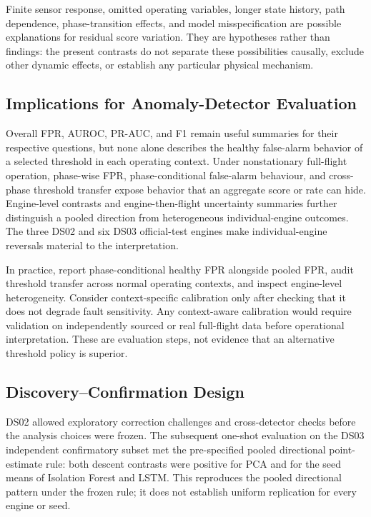 \documentclass[preprint,12pt]{elsarticle}
\begin{document}
Finite sensor response, omitted operating variables, longer state history, path dependence, phase-transition effects, and model misspecification are possible explanations for residual score variation. They are hypotheses rather than findings: the present contrasts do not separate these possibilities causally, exclude other dynamic effects, or establish any particular physical mechanism.

\subsection{Implications for Anomaly-Detector Evaluation}\label{implications-for-anomaly-detector-evaluation}

Overall FPR, AUROC, PR-AUC, and F1 remain useful summaries for their respective questions, but none alone describes the healthy false-alarm behavior of a selected threshold in each operating context. Under nonstationary full-flight operation, phase-wise FPR, phase-conditional false-alarm behaviour, and cross-phase threshold transfer expose behavior that an aggregate score or rate can hide. Engine-level contrasts and engine-then-flight uncertainty summaries further distinguish a pooled direction from heterogeneous individual-engine outcomes. The three DS02 and six DS03 official-test engines make individual-engine reversals material to the interpretation.

In practice, report phase-conditional healthy FPR alongside pooled FPR, audit threshold transfer across normal operating contexts, and inspect engine-level heterogeneity. Consider context-specific calibration only after checking that it does not degrade fault sensitivity. Any context-aware calibration would require validation on independently sourced or real full-flight data before operational interpretation. These are evaluation steps, not evidence that an alternative threshold policy is superior.

\subsection{Discovery--Confirmation Design}\label{discoveryconfirmation-design}

DS02 allowed exploratory correction challenges and cross-detector checks before the analysis choices were frozen. The subsequent one-shot evaluation on the DS03 independent confirmatory subset met the pre-specified pooled directional point-estimate rule: both descent contrasts were positive for PCA and for the seed means of Isolation Forest and LSTM. This reproduces the pooled directional pattern under the frozen rule; it does not establish uniform replication for every engine or seed.
\end{document}

